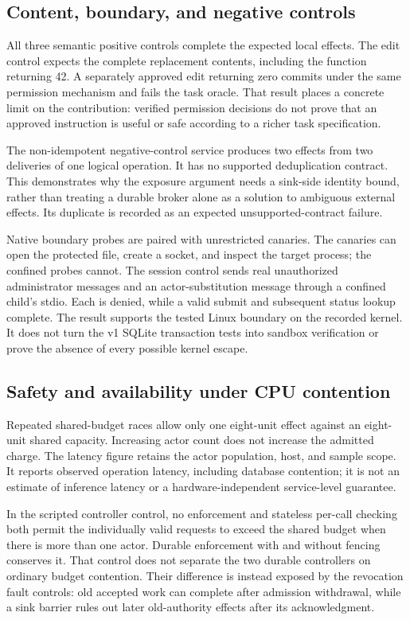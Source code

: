 \subsection{Content, boundary, and negative controls}
All three semantic positive controls complete the expected local effects.
The edit control expects the complete replacement contents, including the
function returning 42. A separately approved edit returning zero commits under
the same permission mechanism and fails the task oracle. That result places a
concrete limit on the contribution: verified permission decisions do not prove
that an approved instruction is useful or safe according to a richer task
specification.

The non-idempotent negative-control service produces two effects from two
deliveries of one logical operation. It has no supported deduplication contract.
This demonstrates why the exposure argument needs a sink-side identity bound,
rather than treating a durable broker alone as a solution to ambiguous external
effects. Its duplicate is recorded as an expected unsupported-contract failure.

Native boundary probes are paired with unrestricted canaries. The canaries
can open the protected file, create a socket, and inspect the target process;
the confined probes cannot. The session control sends real unauthorized
administrator messages and an actor-substitution message through a confined
child's stdio. Each is denied, while a valid submit and subsequent status lookup
complete. The result supports the tested Linux boundary on the recorded kernel.
It does not turn the v1 SQLite transaction tests into sandbox verification or
prove the absence of every possible kernel escape.



\subsection{Safety and availability under CPU contention}
Repeated shared-budget races allow only one eight-unit effect against an
eight-unit shared capacity. Increasing actor count does not increase the
admitted charge. The latency figure retains the actor population, host, and
sample scope. It reports observed operation latency, including database
contention; it is not an estimate of inference latency or a hardware-independent
service-level guarantee.

In the scripted controller control, no enforcement and stateless per-call
checking both permit the individually valid requests to exceed the shared budget
when there is more than one actor. Durable enforcement with and without fencing
conserves it. That control does not separate the two durable controllers on
ordinary budget contention. Their difference is instead exposed by the
revocation fault controls: old accepted work can complete after admission
withdrawal, while a sink barrier rules out later old-authority effects after its
acknowledgment.

